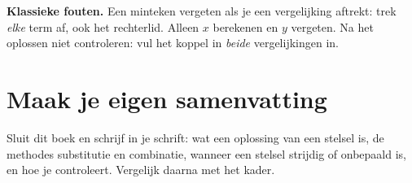 \textbf{Klassieke fouten.} Een minteken vergeten als je een vergelijking aftrekt: trek \emph{elke} term af, ook het rechterlid. Alleen $x$ berekenen en $y$ vergeten. Na het oplossen niet controleren: vul het koppel in \emph{beide} vergelijkingen in.


\opdrachtenkop

\begin{oefeningen}






\end{oefeningen}


\begin{oefeningen}



\end{oefeningen}


\ifzelfstudie
\section*{Maak je eigen samenvatting}
Sluit dit boek en schrijf in je schrift: wat een oplossing van een stelsel is, de methodes substitutie en combinatie, wanneer een stelsel strijdig of onbepaald is, en hoe je controleert. Vergelijk daarna met het kader.
\fi
